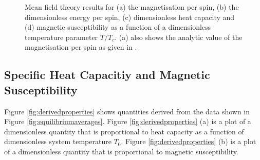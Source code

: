 \documentclass[11pt]{iopart}
\begin{document}
\begin{figure}[t]
        \quad
    \caption{Mean field theory results for (a) the magnetisation per spin, (b) the dimensionless energy per spin, (c) dimensionless heat capacity and (d) magnetic susceptibility as a function of a dimensionless temperature parameter $T/T_c$. (a) also shows the analytic value of the magnetisation per spin as given in \cite{handout}.}
    \label{fig:meanFieldResults}
\end{figure}

\subsection{Specific Heat Capacitiy and Magnetic Susceptibility}

Figure \ref{fig:derivedproperties} shows quantities derived from the data shown in Figure \ref{fig:equilibriumaverages}. Figure \ref{fig:derivedproperties} (a) is a plot of a dimensionless quantity that is proportional to heat capacity as a function of dimensionless system temperature $T_0$. Figure \ref{fig:derivedproperties} (b) is a plot of a dimensionless quantity that is proportional to magnetic susceptibility.
\end{document}
